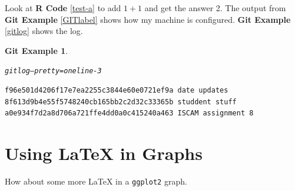 \documentclass{article}\usepackage[]{graphicx}\usepackage[]{color}
\makeatletter
\newenvironment{kframe}{%
 \def\at@end@of@kframe{}%
 \ifinner\ifhmode%
  \def\at@end@of@kframe{\end{minipage}}%
  \begin{minipage}{\columnwidth}%
 \fi\fi%
 \def\FrameCommand##1{\hskip\@totalleftmargin \hskip-\fboxsep
 \colorbox{shadecolor}{##1}\hskip-\fboxsep
     \hskip-\linewidth \hskip-\@totalleftmargin \hskip\columnwidth}%
 \MakeFramed {\advance\hsize-\width
   \@totalleftmargin\z@ \linewidth\hsize
   \@setminipage}}%
 {\par\unskip\endMakeFramed%
 \at@end@of@kframe}
\newenvironment{knitrout}{}{} %
\theoremstyle{rcode}
\newtheorem{GIT}{Git Example}[section]
\makeatother
\begin{document}
Look at \textbf{R Code} \vref{test-a} to add $1 + 1$ and get the answer 2. The output from \textbf{Git Example} \vref{GITlabel} shows how my machine is configured. \textbf{Git Example} \vref{gitlog} shows the log.

\begin{knitrout}
\color{fgcolor}\begin{kframe}
\begin{GIT}\label{gitlog}\hfill{}\begin{alltt}
git log --pretty=oneline -3
\end{alltt}

\begin{verbatim}
f96e501d4206f17e7ea2255c3844e60e0721ef9a date updates
8f613d9b4e55f5748240cb165bb2c2d32c33365b studdent stuff
a0e934f7d2a8d706a721ffe4dd0a0c415240a463 ISCAM assignment 8
\end{verbatim}
\end{GIT}\end{kframe}
\end{knitrout}

\clearpage

\section{Using \LaTeX{} in Graphs}

How about some more \LaTeX{} in a \texttt{ggplot2} graph.
\end{document}
